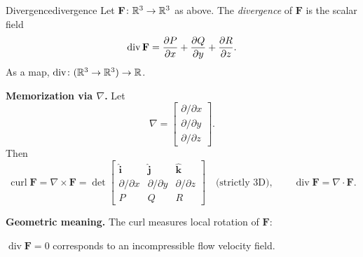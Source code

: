 \begin{definition}{Divergence}{divergence}
  Let $\mathbf{F}\colon\mathbb{R}^3\to\mathbb{R}^3$ as above. The \emph{divergence} of $\mathbf{F}$ is the scalar field
  \[
    \operatorname{div}\mathbf{F}
    = \frac{\partial P}{\partial x} + \frac{\partial Q}{\partial y} + \frac{\partial R}{\partial z}.
  \]
  As a map, $\operatorname{div}\colon(\mathbb{R}^3\to\mathbb{R}^3)\to\mathbb{R}$.
\end{definition}

\textbf{Memorization via $\nabla$.} Let
\[
  \nabla =
  \begin{bmatrix}
    \partial/\partial x \\\partial/\partial y\\\partial/\partial z
  \end{bmatrix}
  .
\]
Then
\[
  \operatorname{curl}\mathbf{F} = \nabla\times\mathbf{F}
  = \det
  \begin{bmatrix}
    \hat{\mathbf{i}}    & \hat{\mathbf{j}}    & \hat{\mathbf{k}}    \\
    \partial/\partial x & \partial/\partial y & \partial/\partial z \\
    P                   & Q                   & R
  \end{bmatrix}
  \quad\text{(strictly 3D)},
  \qquad
  \operatorname{div}\mathbf{F} = \nabla\cdot\mathbf{F}.
\]

\textbf{Geometric meaning.} The curl measures local rotation of $\mathbf{F}$:

\begin{center}
\end{center}

\begin{example}
  $\operatorname{div}\mathbf{F}=0$ corresponds to an incompressible flow velocity field.
\end{example}

